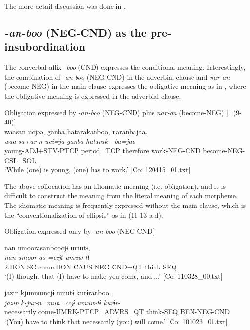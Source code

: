 The more detail discussion was done in .

\subsection{\textit{{}-an-boo} (NEG-CND) as the pre-insubordination}\label{sec:11.2.4}

The converbal affix \textit{{}-boo} (CND) expresses the conditional meaning. Interestingly, the combination of \textit{{}-an-boo} (NEG-CND) in the adverbial clause and \textit{nar-an} (become-NEG) in the main clause expresses the obligative meaning as in , where the obligative meaning is expressed in the adverbial clause.

\ea\label{ex:11-12}  Obligation expressed by \textit{{}-an-boo} (NEG-CND) plus \textit{nar-an} (become-NEG) [=(9-40)]\\
  
      \glll    waasan  ucjəə,  ganba  hatarakanboo, naranbajaa.\\
    \textit{waa-sa+ar-n}  \textit{uci=ja}  \textit{ganba}  \textit{hatarak-} \textit{-ba=jaa}\\
    young-ADJ+STV-PTCP  period=TOP  therefore  work-NEG-CND  become-NEG-CSL=SOL\\    
    \glt ‘While (one) is young, (one) has to work.’     [Co: 120415\_01.txt]
\z

The above collocation has an idiomatic meaning (i.e. obligation), and it is difficult to construct the meaning from the literal meaning of each morpheme. The idiomatic meaning is frequently expressed without the main clause, which is the “conventionalization of ellipsis” \citep[372-373]{Evans2007} as in (11-13 a-d).

\ea\label{ex:11-13}  Obligation expressed only by \textit{{}-an-boo} (NEG-CND)

  \ea\relax  [= (8-122 b)]

    
      \glll    nan  umoorasanboocjɨ  umutɨ,\\
      \textit{nan}  \textit{umoor-as-=ccjɨ}  \textit{umuw-tɨ}\\
      2.HON.SG  come.HON-CAUS-NEG-CND=QT  think-SEQ\\
      \glt       ‘(I) thought that (I) have to make you come, and ...’ [Co: 110328\_00.txt]

  \ex\relax[= (10-33)]

    
      \glll    jazin  kjunmuncjɨ  umutɨ  kurɨranboo.\\
      \textit{jazin}  \textit{k-jur-n=mun=ccjɨ}  \textit{umuw-tɨ}  \textit{kurɨr-}\\
      necessarily  come-UMRK-PTCP=ADVRS=QT  think-SEQ  BEN-NEG-CND\\
      \glt       ‘(You) have to think that necessarily (you) will come.’ [Co: 101023\_01.txt]


